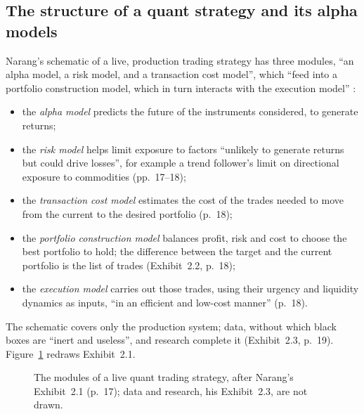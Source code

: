 \subsection{The structure of a quant strategy and its alpha models}

\begin{qfdefinition}\label{def:quant-strategy-components}
 Narang's schematic of a live, production trading strategy has three modules, ``an alpha model, a risk model, and a transaction cost model'', which ``feed into a portfolio construction model, which in turn interacts with the execution model'' \citep[chap.~2, ``An Introduction to Quantitative Trading'', sec.~2.2, Exhibit~2.1, p.~17]{s7-narang}:
\begin{itemize}
\item the \emph{alpha model} predicts the future of the instruments considered, to generate returns;
\item the \emph{risk model} helps limit exposure to factors ``unlikely to generate returns but could drive losses'', for example a trend follower's limit on directional exposure to commodities (pp.~17--18);
\item the \emph{transaction cost model} estimates the cost of the trades needed to move from the current to the desired portfolio (p.~18);
\item the \emph{portfolio construction model} balances profit, risk and cost to choose the best portfolio to hold; the difference between the target and the current portfolio is the list of trades (Exhibit~2.2, p.~18);
\item the \emph{execution model} carries out those trades, using their urgency and liquidity dynamics as inputs, ``in an efficient and low-cost manner'' (p.~18).
\end{itemize}
The schematic covers only the production system; data, without which black boxes are ``inert and useless'', and research complete it (Exhibit~2.3, p.~19). Figure~\ref{fig:quant-strategy-structure} redraws Exhibit~2.1.
\begin{figure}[ht]
\centering

\caption{The modules of a live quant trading strategy, after Narang's Exhibit~2.1 (p.~17); data and research, his Exhibit~2.3, are not drawn.}\label{fig:quant-strategy-structure}
\end{figure}


\end{qfdefinition}
